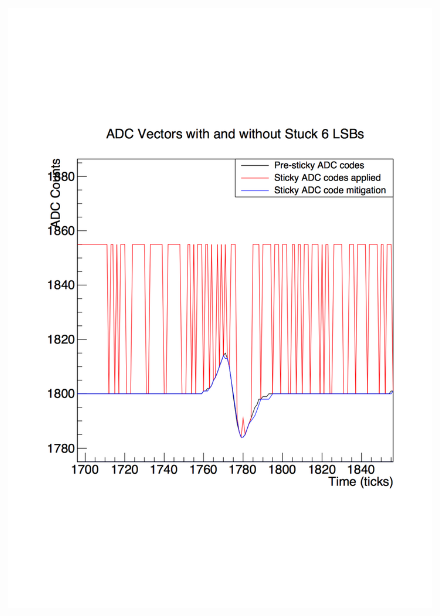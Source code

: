 \begin{figure}[h!]
  \centering
  \begin{minipage}{0.45\textwidth}
    \centering
    \includegraphics[width=\textwidth]{StuckCodes}
  \end{minipage}
  \begin{minipage}{0.45\textwidth}
    \centering

\end{minipage}
\end{figure}
